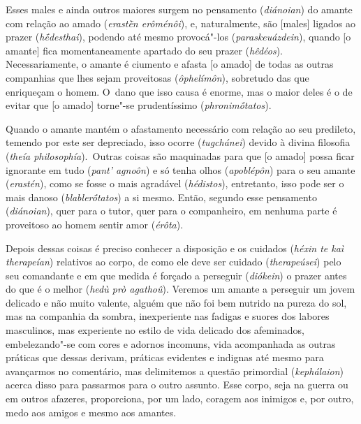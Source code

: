 Esses males e ainda outros maiores surgem no pensamento
(\emph{diánoian}) do amante com relação ao amado (\emph{erastḕn
erôménôi}), e, naturalmente, são [males] ligados ao prazer
(\emph{hḗdesthai}), podendo até mesmo provocá"-los
(\emph{paraskeuázdein}), quando [o amante] fica momentaneamente
apartado do seu prazer (\emph{hêdéos}). Necessariamente, o amante é
ciumento e afasta [o amado] de todas as outras companhias que lhes
sejam proveitosas (\emph{ôphelímôn}), \bekker{[239b]} sobretudo das que
enriqueçam o homem. O~dano que isso causa é enorme, mas o maior deles é
o de evitar que [o amado] torne"-se prudentíssimo
(\emph{phronimṓtatos}).

Quando o amante mantém o afastamento necessário com relação ao seu
predileto, temendo por este ser depreciado, isso ocorre
(\emph{tugchánei}) devido à divina filosofia (\emph{theía
philosophía}).~Outras coisas são maquinadas para que [o amado] possa
ficar ignorante em tudo (\emph{pant' agnoôn}) e só tenha olhos
(\emph{apoblépôn}) para o seu amante (\emph{erastén}), como se fosse o
mais agradável (\emph{hédistos}), entretanto, isso pode ser o mais danoso
(\emph{blablerṓtatos}) a si mesmo. \bekker{[239c]} Então, segundo esse
pensamento (\emph{diánoian}), quer para o tutor, quer para o
companheiro, em nenhuma parte é proveitoso ao homem sentir amor
(\emph{érôta}).

Depois dessas coisas é preciso conhecer a disposição e os cuidados
(\emph{héxin te kaì therapeían}) relativos ao corpo, de como ele deve
ser cuidado (\emph{therapeúsei}) pelo seu comandante e em que medida é
forçado a perseguir (\emph{diókein}) o prazer antes do que é o melhor
(\emph{hedù prò agathoû}). Veremos um amante a perseguir um jovem
delicado e não muito valente, alguém que não foi bem nutrido na pureza
do sol, mas na companhia da sombra, inexperiente nas fadigas e suores
dos labores masculinos, mas experiente no estilo de vida delicado dos
afeminados, \bekker{[239d]} embelezando"-se com cores e adornos incomuns, vida
acompanhada as outras práticas que dessas derivam, práticas evidentes e
indignas até mesmo para avançarmos no comentário, mas delimitemos a
questão primordial (\emph{kephálaion}) acerca disso para passarmos para
o outro assunto. Esse corpo, seja na guerra ou em outros afazeres,
proporciona, por um lado, coragem aos inimigos e, por outro, medo aos
amigos e mesmo aos amantes.

